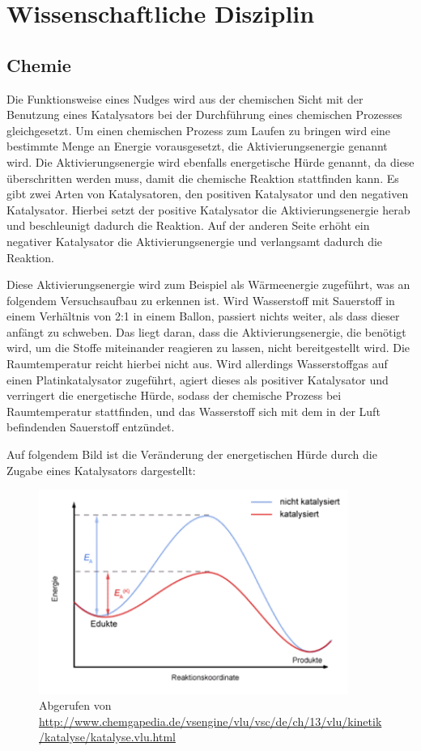 \chapter{Wissenschaftliche Disziplin}
\section{Chemie}
Die Funktionsweise eines Nudges wird aus der chemischen Sicht mit der Benutzung eines Katalysators bei der Durchführung eines chemischen Prozesses gleichgesetzt. Um einen chemischen Prozess zum Laufen zu bringen wird eine bestimmte Menge an Energie vorausgesetzt, die Aktivierungsenergie genannt wird. Die Aktivierungsenergie wird ebenfalls energetische Hürde genannt, da diese überschritten werden muss, damit die chemische Reaktion stattfinden kann. Es gibt zwei Arten von Katalysatoren, den positiven Katalysator und den negativen Katalysator. Hierbei setzt der positive Katalysator die Aktivierungsenergie herab und beschleunigt dadurch die Reaktion. Auf der anderen Seite erhöht ein negativer Katalysator die Aktivierungsenergie und verlangsamt dadurch die Reaktion.

Diese Aktivierungsenergie wird zum Beispiel als Wärmeenergie zugeführt, was an folgendem Versuchsaufbau zu erkennen ist.
Wird Wasserstoff mit Sauerstoff in einem Verhältnis von 2:1 in einem Ballon, passiert nichts weiter, als dass dieser anfängt zu schweben. Das liegt daran, dass die Aktivierungsenergie, die benötigt wird, um die Stoffe miteinander reagieren zu lassen, nicht bereitgestellt wird. Die Raumtemperatur reicht hierbei nicht aus. Wird allerdings Wasserstoffgas auf einen Platinkatalysator zugeführt, agiert dieses als positiver Katalysator und verringert die energetische Hürde, sodass der chemische Prozess bei Raumtemperatur stattfinden, und das Wasserstoff sich mit dem in der Luft befindenden Sauerstoff entzündet. 

Auf folgendem Bild ist die Veränderung der energetischen Hürde durch die Zugabe eines Katalysators dargestellt:

\begin{figure}[ht]
    \centering
    \includegraphics[width=0.9\textwidth]{Bilder/Chemie.png}
    \caption{Abgerufen von \url{http://www.chemgapedia.de/vsengine/vlu/vsc/de/ch/13/vlu/kinetik/katalyse/katalyse.vlu.html}}
    \label{fig:chemie}
\end{figure}

